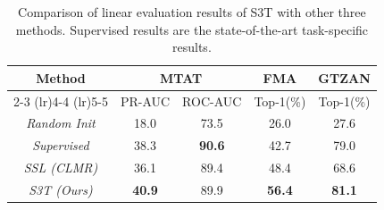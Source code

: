 \documentclass{article}
\begin{document}
\begin{table}[t]
\centering
\small 
\vspace{0.3cm}
\begin{tabular}{ c | c c c c}
	\toprule
	\multirow{2}{*}[-0.7ex]{Method}  & \multicolumn{2}{c}{MTAT} & FMA & GTZAN \\
    \cmidrule(lr){2-3} 
    \cmidrule(lr){4-4} \cmidrule(lr){5-5}
	& PR-AUC & ROC-AUC  & Top-1(\%) & Top-1(\%) \\
	\midrule
	\textit{Random Init} & 18.0 & 73.5 & 26.0 & 27.6 \\
    \textit{Supervised} & 38.3 & \textbf{90.6} & 42.7 & 79.0 \\
    \textit{SSL (CLMR)} & 36.1 & 89.4 & 48.4 & 68.6 \\
    \textit{S3T (Ours)} & \textbf{40.9} & 89.9 & \textbf{56.4} & \textbf{81.1} \\
	\bottomrule
\end{tabular}
\vspace{-0.2cm}
\caption{Comparison of linear evaluation results of S3T with other three methods. Supervised results are the state-of-the-art task-specific results.}
\label{tab:main_results_new}
\end{table}
\end{document}
